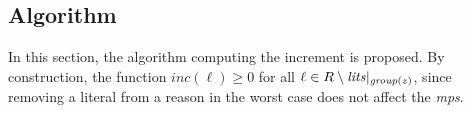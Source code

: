\subsection{Algorithm}
In this section, the algorithm computing the increment is proposed. By construction,
the function \(\mathit{inc}(\ell) \geq 0\) for all \(\ell \in R \setminus \mathit{lits}|_{\mathit{group}(z)}\), since removing 
a literal from a reason in the worst case does not affect the \textit{mps}.





